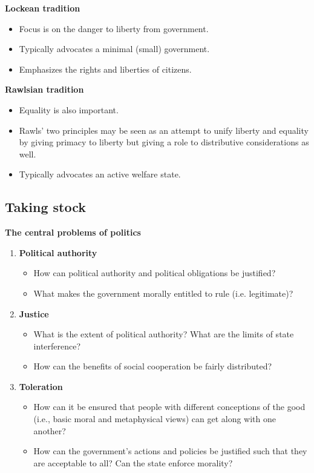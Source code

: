 \textbf{Lockean tradition}
\begin{itemize}
	\item Focus is on the danger to liberty from government.
	\item Typically advocates a minimal (small) government.
	\item Emphasizes the rights and liberties of citizens.
\end{itemize}

\textbf{Rawlsian tradition}
\begin{itemize}
	\item Equality is also important.
	\item Rawls' two principles may be seen as an attempt to unify liberty
	 and equality by giving primacy to liberty but giving a role to
	 distributive considerations as well.
	\item Typically advocates an active welfare state.
\end{itemize}

\subsection{Taking stock}

\textbf{The central problems of politics}

\begin{enumerate}
	\item \textbf{Political authority}
	\begin{itemize}
		\item How can political authority and political obligations be
		 justified?
		\item What makes the government morally entitled to rule (i.e.
		 legitimate)?
	\end{itemize}
	\item \textbf{Justice}
	\begin{itemize}
		\item What is the extent of political authority? What are the
		 limits of state interference?
		\item How can the benefits of social cooperation be fairly
		 distributed?
	\end{itemize}
	\item \textbf{Toleration}
	\begin{itemize}
		\item How can it be ensured that people with different
		 conceptions of the good (i.e., basic moral and metaphysical
		 views) can get along with one another?
		\item How can the government's actions and policies be
		 justified such that they are acceptable to all? Can the state
		 enforce morality?
	\end{itemize}
\end{enumerate}

